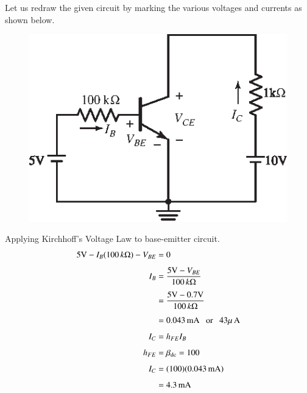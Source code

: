 \begin{solution}
Let us redraw the given circuit by marking the various voltages and currents as shown below.
\begin{figure}[H]
\centering
\includegraphics[scale=1.1]{chap3/S3-EE-03-IN006.eps}
\end{figure}

Applying Kirchhoff's Voltage Law to base-emitter circuit.
\begin{align*}
5\text{V}-I_{B}(100\,k\Omega)-V_{BE} &=0\\[4pt]
I_{B} &= \frac{5\text{V}-V_{BE}}{100\, k\Omega}\\[4pt]
&= \frac{5\text{V}-0.7\text{V}}{100\, k\Omega}\\[4pt]
&= 0.043\text{\,mA}\text{~~ or~~ } 43\mu\text{\,A}\\[4pt]
I_{C} &= h_{FE}I_{B}\\[4pt]
h_{FE} &= \beta_{\operatorname{dc}} = 100\\[4pt]
I_{C} &= (100)(0.043\text{\,mA})\\[4pt]
&= 4.3\text{\,mA} 
\end{align*}


\end{solution}
